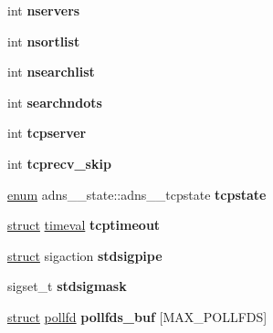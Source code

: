 \begin{DoxyCompactItemize}
\item 
\mbox{\label{structadns____state_a071ea4a04a378a383b301117a4a2fd3a}} 
int {\bfseries nservers}
\item 
\mbox{\label{structadns____state_ae4c03a9d328ccea4408be1df4c45b3ba}} 
int {\bfseries nsortlist}
\item 
\mbox{\label{structadns____state_aaf1799ae41a85b8f618191cf3095d11c}} 
int {\bfseries nsearchlist}
\item 
\mbox{\label{structadns____state_a3ad2efb3c4532357a02c25c566871614}} 
int {\bfseries searchndots}
\item 
\mbox{\label{structadns____state_ad3fc5f3af8cc0db87e51b80eb3b5b38a}} 
int {\bfseries tcpserver}
\item 
\mbox{\label{structadns____state_a67ee9b6dbf7c7e419f977bcbea943672}} 
int {\bfseries tcprecv\+\_\+skip}
\item 
\mbox{\label{structadns____state_a8d002373a11b1f21e4b14c6ba9b7a61c}} 
\hyperlink{interfaceenum}{enum} adns\+\_\+\+\_\+state\+::adns\+\_\+\+\_\+tcpstate {\bfseries tcpstate}
\item 
\mbox{\label{structadns____state_aa960a79980c77e8d41f5c3bb9dddd33d}} 
\hyperlink{interfacestruct}{struct} \hyperlink{structtimeval}{timeval} {\bfseries tcptimeout}
\item 
\mbox{\label{structadns____state_ad62e0fcbba673057ecb42a6ecbaf81d4}} 
\hyperlink{interfacestruct}{struct} sigaction {\bfseries stdsigpipe}
\item 
\mbox{\label{structadns____state_a90ac32b7dee26e85994fea1e6170d74d}} 
sigset\+\_\+t {\bfseries stdsigmask}
\item 
\mbox{\label{structadns____state_a819ab6bb97794311fb428750bf6eb4ec}} 
\hyperlink{interfacestruct}{struct} \hyperlink{structpollfd}{pollfd} {\bfseries pollfds\+\_\+buf} \mbox{[}M\+A\+X\+\_\+\+P\+O\+L\+L\+F\+DS\mbox{]}

\end{DoxyCompactItemize}

